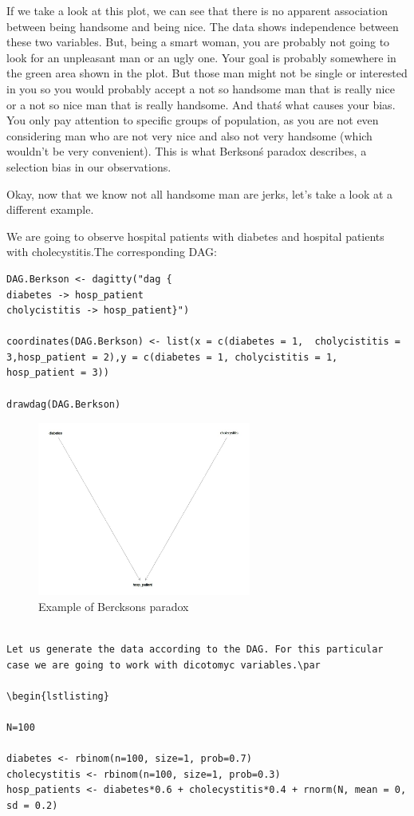 \documentclass{article}
\begin{document}
If we take a look at this plot, we can see that there is no apparent association between being handsome and being nice. The data shows independence between these two variables. But, being a smart woman, you are probably not going to look for an unpleasant man or an ugly one. Your goal is probably somewhere in the green area shown in the plot. But those man might not be single or interested in you so you would probably accept a not so handsome man that is really nice or a not so nice man that is really handsome. And that\'s what causes your bias. You only pay attention to specific groups of population, as you are not even considering man who are not very nice and also not very handsome (which wouldn't be very convenient). This is what Berkson\'s paradox describes, a selection bias in our observations.\par
Okay, now that we know not all handsome man are jerks, let's take a look at a different example.\par
We are going to observe hospital patients with diabetes and hospital patients with cholecystitis.The corresponding DAG:\par

\begin{lstlisting}
DAG.Berkson <- dagitty("dag {
diabetes -> hosp_patient
cholycistitis -> hosp_patient}")

coordinates(DAG.Berkson) <- list(x = c(diabetes = 1,  cholycistitis = 3,hosp_patient = 2),y = c(diabetes = 1, cholycistitis = 1, hosp_patient = 3))

drawdag(DAG.Berkson)
\end{lstlisting}

\begin{figure}[h]
\caption{Example of Bercksons paradox}
\includegraphics[width=7cm]{BERKS_DAG.png} %
\centering
\end{figure}
\begin{lstlisting}

Let us generate the data according to the DAG. For this particular case we are going to work with dicotomyc variables.\par

\begin{lstlisting}

N=100

diabetes <- rbinom(n=100, size=1, prob=0.7)
cholecystitis <- rbinom(n=100, size=1, prob=0.3) 
hosp_patients <- diabetes*0.6 + cholecystitis*0.4 + rnorm(N, mean = 0, sd = 0.2)

\end{lstlisting}
\end{document}
